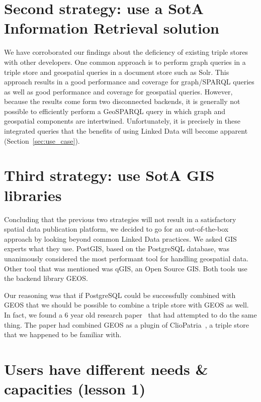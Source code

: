 \documentclass[a4paper]{scrartcl}
\begin{document}
\section{Second strategy: use a SotA Information Retrieval solution}

We have corroborated our findings about the deficiency of existing
triple stores with other developers.  One common approach is to
perform graph queries in a triple store and geospatial queries in a
document store such as Solr.
This approach results in a good performance and coverage for
graph/SPARQL queries as well as good performance and coverage for
geospatial queries.  However, because the results come form two
disconnected backends, it is generally not possible to efficiently
perform a GeoSPARQL query in which graph and geospatial components are
intertwined.  Unfortunately, it is precisely in these integrated
queries that the benefits of using Linked Data will become apparent
(Section~\ref{sec:use_case}).


\section{Third strategy: use SotA GIS libraries}

Concluding that the previous two strategies will not result in a
satisfactory spatial data publication platform, we decided to go for
an out-of-the-box approach by looking beyond common Linked Data
practices.  We asked GIS experts what they use.
PostGIS, based on the
PostgreSQL database, was
unanimously considered the most performant tool for handling
geospatial data.  Other tool that was mentioned was
qGIS, an Open Source GIS.  Both tools
use the backend library GEOS.

Our reasoning was that if PostgreSQL could be successfully combined
with GEOS that we should be possible to combine a triple store with
GEOS as well.  In fact, we found a 6 year old research
paper~\cite{VanHage2010} that had attempted to do the same thing.  The
paper had combined GEOS as a plugin of
ClioPatria~\cite{Wielemaker2015}, a triple store that we happened to be
familiar with.


\section{Users have different needs \& capacities (lesson 1)}
\end{document}
